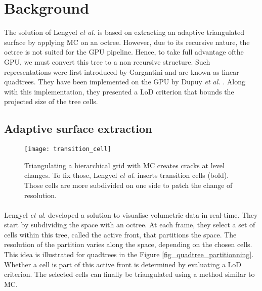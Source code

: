 \section{Background}

The solution of Lengyel \textit{et al.} \cite{lengyel2010voxel} is based on extracting an adaptive triangulated surface by applying MC on an octree.
However, due to its recursive nature, the octree is not suited for the GPU pipeline.
Hence, to take full advantage ofthe GPU, we must convert this tree to a non recursive structure.
Such representations were first introduced by Gargantini \cite{gargantini1982effective} and are known as linear quadtrees.
They have been implemented on the GPU by Dupuy \textit{et al.} \cite{dupuy2014quadtrees}.
Along with this implementation, they presented a LoD criterion that bounds the projected size of the tree cells.

\subsection{Adaptive surface extraction}

\begin{figure}
\centering
\texttt{[image: transition\_cell]}
\caption{ Triangulating a hierarchical grid with MC creates cracks at level changes.
To fix those, Lengyel \textit{et al}. inserts transition cells (bold).
Those cells are more subdivided on one side to patch the change of resolution.}
\label{transition_cell}
\end{figure}


\paragraph{}
Lengyel \textit{et al}. \cite{lengyel2010voxel} developed a solution to visualise volumetric data in real-time.
They start by subdividing the space with an octree.
At each frame, they select a set of cells within this tree, called the active front, that partitions the space.
The resolution of the partition varies along the space, depending on the chosen cells.
This idea is illustrated for quadtrees in the Figure \ref{fig_quadtree_partitionning}.
Whether a cell is part of this active front is determined by evaluating a LoD criterion.
The selected cells can finally be triangulated using a method similar to MC.


